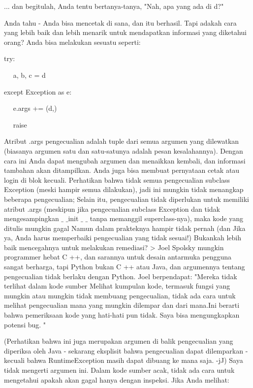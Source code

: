 ... dan begitulah, Anda tentu bertanya-tanya, "Nah, apa yang ada di d?" 

\vspace{12pt}

Anda tahu - Anda bisa mencetak di sana, dan itu berhasil. Tapi adakah cara yang lebih baik dan lebih menarik untuk mendapatkan informasi yang diketahui orang? Anda bisa melakukan sesuatu seperti: 
\vspace{20pt}

 
 try: 
 
 
~~ a, b, c = d 
 
 
 except Exception as e: 
 
 
~~ e.args += (d,) 
 
 
~~ raise 
\vspace{20pt}
 
 \hspace*{0.64in} Atribut .args pengecualian adalah tuple dari semua argumen yang dilewatkan (biasanya argumen satu dan satu-satunya adalah pesan kesalahannya). Dengan cara ini Anda dapat mengubah argumen dan menaikkan kembali, dan informasi tambahan akan ditampilkan. Anda juga bisa membuat pernyataan cetak atau login di blok kecuali. Perhatikan bahwa tidak semua pengecualian subclass Exception (meski hampir semua dilakukan), jadi ini mungkin tidak menangkap beberapa pengecualian; Selain itu, pengecualian tidak diperlukan untuk memiliki atribut .args (meskipun jika pengecualian subclass Exception dan tidak mengesampingkan  $  \_  $ $  \_  $init $  \_  $ $  \_  $ tanpa memanggil superclass-nya), maka kode yang ditulis mungkin gagal Namun dalam prakteknya hampir tidak pernah (dan Jika ya, Anda harus memperbaiki pengecualian yang tidak sesuai!) Bukankah lebih baik mencegahnya untuk melakukan remediasi? >  
 Joel Spolsky mungkin programmer hebat C ++, dan sarannya untuk desain antarmuka pengguna sangat berharga, tapi Python bukan C ++ atau Java, dan argumennya tentang pengecualian tidak berlaku dengan Python. Joel berpendapat: "Mereka tidak terlihat dalam kode sumber Melihat kumpulan kode, termasuk fungsi yang mungkin atau mungkin tidak membuang pengecualian, tidak ada cara untuk melihat pengecualian mana yang mungkin dilempar dan dari mana.Ini berarti bahwa pemeriksaan kode yang hati-hati pun tidak. Saya bisa mengungkapkan potensi bug. " 

 \hspace*{0.64in} (Perhatikan bahwa ini juga merupakan argumen di balik pengecualian yang diperiksa oleh Java - sekarang eksplisit bahwa pengecualian dapat dilemparkan - kecuali bahwa RuntimeException masih dapat dibuang ke mana saja. -jJ) Saya tidak mengerti argumen ini. Dalam kode sumber acak, tidak ada cara untuk mengetahui apakah akan gagal hanya dengan inspeksi. Jika Anda melihat: 

